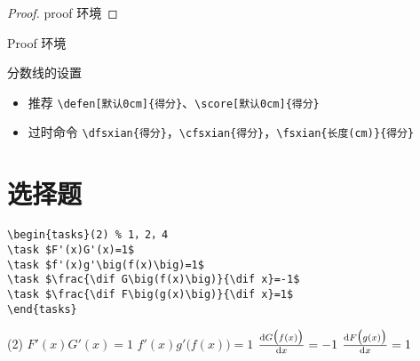 \documentclass[11pt,twoside]{article} %
\begin{document}
\begin{proof}
proof 环境
\end{proof}

\begin{Proof}
Proof 环境
\end{Proof}

\vspace{1.5em}
\noindent 分数线的设置
\begin{itemize}
\item 推荐 \lstinline[style=iltx]|\defen[默认0cm]{得分}|、\lstinline[style=iltx]|\score[默认0cm]{得分}|
\item 过时命令 \lstinline[style=iltx]|\dfsxian{得分}|，\lstinline[style=iltx]|\cfsxian{得分}|，\lstinline[style=iltx]|\fsxian{长度(cm)}{得分}|
\end{itemize}



\section{选择题}

\begin{lstlisting}[style=tsdtex]
\begin{tasks}(2) % 1，2，4
\task $F'(x)G'(x)=1$
\task $f'(x)g'\big(f(x)\big)=1$
\task $\frac{\dif G\big(f(x)\big)}{\dif x}=-1$
\task $\frac{\dif F\big(g(x)\big)}{\dif x}=1$	
\end{tasks}
\end{lstlisting}
\begin{tasks}(2) %
\task $F'(x)G'(x)=1$
\task $f'(x)g'\big(f(x)\big)=1$
\task $\frac{\mathop{}\!\mathrm{d} G\big(f(x)\big)}{\mathop{}\!\mathrm{d} x}=-1$
\task $\frac{\mathop{}\!\mathrm{d} F\big(g(x)\big)}{\mathop{}\!\mathrm{d} x}=1$	
\end{tasks}



\clearpage
\end{document}
